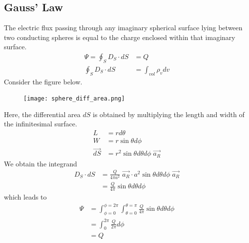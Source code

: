 \documentclass{article}
\begin{document}
\subsection{Gauss' Law}
\noindent 
The electric flux passing through any imaginary spherical surface lying between two 
conducting spheres is equal to the charge enclosed within that imaginary surface.
\begin{align*}
\Psi = \oint_S D_S \cdot dS &= Q \\ 
\oint_S D_S \cdot dS &= \int_{vol} \rho_v dv
\end{align*}
\newpage 
\noindent 
Consider the figure below. 
\begin{figure}[H]
    \center
    \texttt{[image: sphere\_diff\_area.png]}
\end{figure}
\noindent 
Here, the differential area $dS$ is obtained by multiplying the length and width 
of the infinitesimal surface. 
\begin{align*}
L &= r d\theta \\
W &= r \sin\theta d\phi \\ 
\vec{dS} &= r^2 \sin\theta d\theta d\phi \;\vec{a_R}
\end{align*}
\noindent 
We obtain the integrand 
\begin{align*}
D_S \cdot dS &= \frac{Q}{4\pi a^2} \; \vec{a_R} \cdot 
a^2 \sin\theta d\theta d\phi \;\vec{a_R} \\ 
&= \frac{Q}{4\pi} \sin\theta d\theta d\phi
\end{align*}
\noindent 
which leads to 
\begin{align*}
\Psi &= \int_{\phi=0}^{\phi=2\pi} \int_{\theta=0}^{\theta=\pi}
\frac{Q}{4\pi}\sin\theta d\theta d\phi \\ 
&= \int_{0}^{2\pi} \frac{Q}{2\pi} d\phi \\ 
&= Q 
\end{align*}
\end{document}
